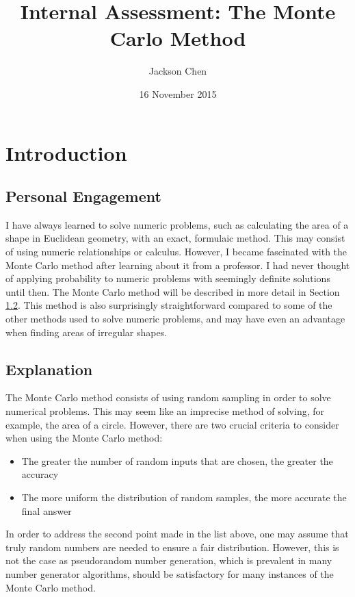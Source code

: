 \documentclass[10pt, letterpaper]{article}
\newcommand{\subtitle}[1]{
  \posttitle{
    \par\end{center}
    \begin{center}\large#1\end{center}
    \vskip0.5em}
}
\begin{document}
  \title{Internal Assessment: The Monte Carlo Method}
  \subtitle {IB Math HL Period 5, Dr. Silverman}
  \date{16 November 2015}
  \author{Jackson Chen}
  \maketitle

  \section{Introduction}

  \subsection{Personal Engagement}

  I have always learned to solve numeric problems, such as calculating the area of a shape in Euclidean geometry,
  with an exact, formulaic method. This may consist of using numeric relationships or calculus. However, I became fascinated with
  the Monte Carlo method after learning about it from a professor. I had never thought of applying probability to numeric problems
  with seemingly definite solutions until then. The Monte Carlo method will be described in more detail in Section \ref{subsec:explanation}.
  This method is also surprisingly straightforward compared to some of
  the other methods used to solve numeric problems, and may have even an advantage when finding areas of irregular shapes.

  \subsection{Explanation} \label{subsec:explanation}

  The Monte Carlo method consists of using random sampling in order to solve numerical problems. This may seem like an imprecise method
  of solving, for example, the area of a circle. However, there are two crucial criteria to consider when using the Monte Carlo method:
  \begin{itemize}
    \item The greater the number of random inputs that are chosen, the greater the accuracy
    \item The more uniform the distribution of random samples, the more accurate the final answer
  \end{itemize}

  In order to address the second point made in the list above, one may assume that truly random numbers are needed to ensure a fair distribution.
  However, this is not the case as pseudorandom number generation, which is prevalent in many number generator algorithms, should be satisfactory
  for many instances of the Monte Carlo method.
\end{document}
